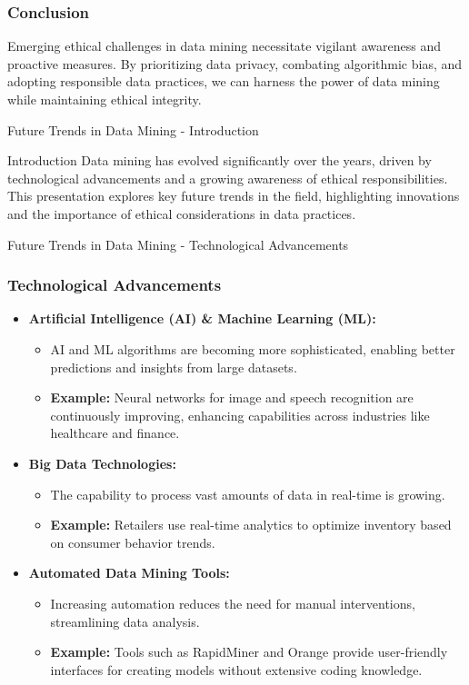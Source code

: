 \documentclass[aspectratio=169]{beamer}
\begin{document}
\begin{frame}[fragile]
    \frametitle{Conclusion}
    Emerging ethical challenges in data mining necessitate vigilant awareness and proactive measures. 
    By prioritizing data privacy, combating algorithmic bias, and adopting responsible data practices, we can harness the power of data mining while maintaining ethical integrity.
\end{frame}

\begin{frame}[fragile]{Future Trends in Data Mining - Introduction}
    \begin{block}{Introduction}
        Data mining has evolved significantly over the years, driven by technological advancements and a growing awareness of ethical responsibilities.
        This presentation explores key future trends in the field, highlighting innovations and the importance of ethical considerations in data practices.
    \end{block}
\end{frame}

\begin{frame}[fragile]{Future Trends in Data Mining - Technological Advancements}
    \frametitle{Technological Advancements}
    \begin{itemize}
        \item \textbf{Artificial Intelligence (AI) \& Machine Learning (ML):}
            \begin{itemize}
                \item AI and ML algorithms are becoming more sophisticated, enabling better predictions and insights from large datasets.
                \item \textbf{Example:} Neural networks for image and speech recognition are continuously improving, enhancing capabilities across industries like healthcare and finance.
            \end{itemize}
        
        \item \textbf{Big Data Technologies:}
            \begin{itemize}
                \item The capability to process vast amounts of data in real-time is growing.
                \item \textbf{Example:} Retailers use real-time analytics to optimize inventory based on consumer behavior trends.
            \end{itemize}

        \item \textbf{Automated Data Mining Tools:}
            \begin{itemize}
                \item Increasing automation reduces the need for manual interventions, streamlining data analysis.
                \item \textbf{Example:} Tools such as RapidMiner and Orange provide user-friendly interfaces for creating models without extensive coding knowledge.
            \end{itemize}
    \end{itemize}
\end{frame}
\end{document}

